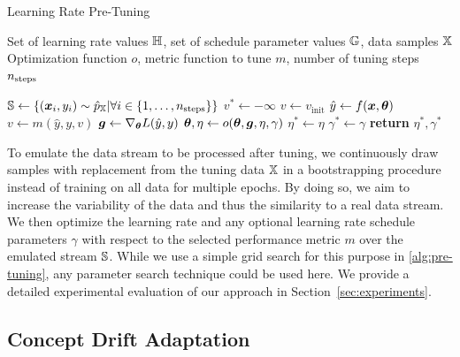 \documentclass{article} %
\begin{document}
\begin{algorithm}
   \caption{Learning Rate Pre-Tuning}\label{alg:pre-tuning}
   \begin{algorithmic}[1]
      \Require Set of learning rate values ${\mathbb{H}}$, set of schedule parameter values ${\mathbb{G}}$, data samples ${\mathbb{X}}$
      \Require Optimization function $o$, metric function to tune $m$, number of tuning steps $n_{\rm{steps}}$

      \State ${\mathbb{S}} \gets \{({\bm{x}}_i, y_i) \sim \hat{p}_{{\mathbb{X}}}| \forall i \in \{1, \ldots, n_{\text{steps}}\} \}$ 
      \State $v^* \gets -\infty$
      \State $v \gets v_{\textrm{init}}$ 
      \State $\hat{y} \gets f({\bm{x}}, {\bm{\theta}})$ 
      \State $v \gets m(\hat{y}, y, v)$ 
      \State ${\bm{g}} \gets \nabla_{{\bm{\theta}}} L(\hat{y}, y)$ 
      \State ${\bm{\theta}}, \eta \gets o({\bm{\theta}}, {\bm{g}}, \eta, \gamma)$ 
      \EndFor
      \State $\eta^* \gets \eta$ 
      \State $\gamma^* \gets \gamma$ 
      \EndIf
      \EndFor
      \State \textbf{return} $\eta^*, \gamma^*$ 
   \end{algorithmic}
\end{algorithm}

To emulate the data stream to be processed after tuning, we continuously draw samples with replacement from the tuning data ${\mathbb{X}}$ in a bootstrapping procedure instead of training on all data for multiple epochs.
By doing so, we aim to increase the variability of the data and thus the similarity to a real data stream.
We then optimize the learning rate and any optional learning rate schedule parameters $\gamma$ with respect to the selected performance metric $m$ over the emulated stream ${\mathbb{S}}$.
While we use a simple grid search for this purpose in \cref{alg:pre-tuning}, any parameter search technique could be used here.
We provide a detailed experimental evaluation of our approach in Section~\ref{sec:experiments}.


\subsection{Concept Drift Adaptation}
\end{document}
